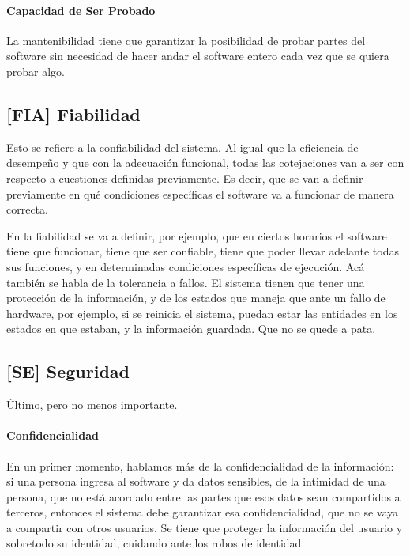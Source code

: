\hypertarget{testeable}{%
\paragraph{Capacidad de Ser Probado}\label{testeable}}
La mantenibilidad tiene que
  garantizar la posibilidad de probar partes del software sin necesidad
  de hacer andar el software entero cada vez que se quiera probar algo.

\hypertarget{fiabilidad-fia}{%
\subsection{%
{[}FIA{]}
Fiabilidad
}\label{fiabilidad-fia}}

Esto se refiere a la confiabilidad del sistema. Al igual que la
eficiencia de desempeño y que con la adecuación funcional, todas las
cotejaciones van a ser con respecto a cuestiones definidas previamente.
Es decir, que se van a definir previamente en qué condiciones
específicas el software va a funcionar de manera correcta.

En la fiabilidad se va a definir, por ejemplo, que en ciertos horarios
el software tiene que funcionar, tiene que ser confiable, tiene que
poder llevar adelante todas sus funciones, y en determinadas condiciones
específicas de ejecución. Acá también se habla de la tolerancia a
fallos. El sistema tienen que tener una protección de la información, y
de los estados que maneja que ante un fallo de hardware, por ejemplo, si
se reinicia el sistema, puedan estar las entidades en los estados en que
estaban, y la información guardada. Que no se quede a pata.

\hypertarget{seguridad-se}{%
\subsection{%
{[}SE{]}
Seguridad
}\label{seguridad-se}}

Último, pero no menos importante.


\hypertarget{confidencialidad}{%
\paragraph{Confidencialidad}\label{confidencialidad}}
En un primer momento, hablamos más de la
  confidencialidad de la información: si una persona ingresa al software
  y da datos sensibles, de la intimidad de una persona, que no está
  acordado entre las partes que esos datos sean compartidos a terceros,
  entonces el sistema debe garantizar esa confidencialidad, que no se
  vaya a compartir con otros usuarios. Se tiene que proteger la
  información del usuario y sobretodo su identidad, cuidando ante los
  robos de identidad.

